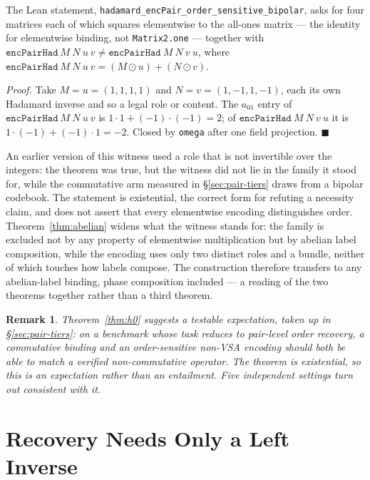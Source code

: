 \documentclass[10pt]{article}
\newtheorem{remark}[theorem]{Remark}
\begin{document}
The Lean statement, \texttt{hadamard\_encPair\_order\_sensitive\_bipolar}, asks for four matrices each of which squares elementwise to the all-ones matrix --- the identity for elementwise binding, not \texttt{Matrix2.one} --- together with $\texttt{encPairHad}\ M\ N\ u\ v \neq \texttt{encPairHad}\ M\ N\ v\ u$, where $\texttt{encPairHad}\ M\ N\ u\ v = (M \odot u) + (N \odot v)$.

\emph{Proof.} Take $M = u = (1,1,1,1)$ and $N = v = (1,-1,1,-1)$, each its own Hadamard inverse and so a legal role or content. The $a_{01}$ entry of $\texttt{encPairHad}\ M\ N\ u\ v$ is $1{\cdot}1 + (-1){\cdot}(-1) = 2$; of $\texttt{encPairHad}\ M\ N\ v\ u$ it is $1{\cdot}(-1) + (-1){\cdot}1 = -2$. Closed by \texttt{omega} after one field projection. $\blacksquare$

An earlier version of this witness used a role that is not invertible over the integers: the theorem was true, but the witness did not lie in the family it stood for, while the commutative arm measured in \S\ref{sec:pair-tiers} draws from a bipolar codebook. The statement is existential, the correct form for refuting a necessity claim, and does not assert that every elementwise encoding distinguishes order. Theorem~\ref{thm:abelian} widens what the witness stands for: the family is excluded not by any property of elementwise multiplication but by abelian label composition, while the encoding uses only two distinct roles and a bundle, neither of which touches how labels compose. The construction therefore transfers to any abelian-label binding, phase composition included --- a reading of the two theorems together rather than a third theorem.

\begin{remark}
\label{rem:predictions}
Theorem~\ref{thm:h0} suggests a testable expectation, taken up in \S\ref{sec:pair-tiers}: on a benchmark whose task reduces to pair-level order recovery, a commutative binding and an order-sensitive non-VSA encoding should both be able to match a verified non-commutative operator. The theorem is existential, so this is an expectation rather than an entailment. Five independent settings turn out consistent with it.
\end{remark}

\section{Recovery Needs Only a Left Inverse}
\label{sec:recovery}
\end{document}
